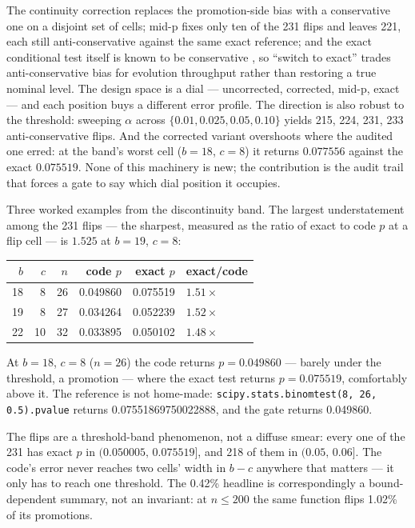 \documentclass[10pt]{article}
\newcommand{\code}[1]{\texttt{#1}}
\begin{document}
\noindent The continuity correction replaces the promotion-side bias with a
conservative one on a disjoint set of cells; mid-p fixes only ten
of the 231 flips and leaves 221, each still anti-conservative against the same
exact reference; and the exact conditional test itself is known to be conservative \citep{fagerland2013mcnemar}, so ``switch to exact'' trades
anti-conservative bias for evolution throughput rather than restoring a true
nominal level. The design space is a dial --- uncorrected, corrected, mid-p,
exact --- and each position buys a different error profile. The direction is
also robust to the threshold: sweeping $\alpha$ across
$\{0.01, 0.025, 0.05, 0.10\}$ yields 215, 224, 231, 233 anti-conservative
flips. And the corrected variant overshoots where the audited one erred: at
the band's worst cell ($b{=}18$, $c{=}8$) it returns $0.077556$ against the
exact $0.075519$. None of this
machinery is new; the contribution is the audit trail that forces a gate to
say which dial position it occupies.

Three worked examples from the discontinuity band. The largest
understatement among the 231 flips --- the sharpest, measured as the ratio
of exact to code $p$ at a flip cell --- is $1.525$ at $b{=}19$, $c{=}8$:

\begin{center}
\begin{tabular}{rrrrrl}
\toprule
$b$ & $c$ & $n$ & code $p$ & exact $p$ & exact/code \\
\midrule
18 & 8 & 26 & 0.049860 & 0.075519 & $1.51\times$ \\
19 & 8 & 27 & 0.034264 & 0.052239 & $1.52\times$ \\
22 & 10 & 32 & 0.033895 & 0.050102 & $1.48\times$ \\
\bottomrule
\end{tabular}
\end{center}

\noindent At $b{=}18$, $c{=}8$ ($n{=}26$) the code returns $p=0.049860$ ---
barely under the threshold, a promotion --- where the exact test returns
$p=0.075519$, comfortably above it. The reference is not home-made:
\code{scipy.stats.binomtest(8, 26, 0.5).pvalue} returns
0.07551869750022888, and the gate returns 0.049860.

The flips are a threshold-band phenomenon, not a diffuse smear: every one of
the 231 has exact $p$ in $(0.050005,\,0.075519]$, and 218 of them in
$(0.05,\,0.06]$. The code's error never reaches two cells' width in $b-c$
anywhere that matters --- it only has to reach one threshold. The 0.42\%
headline is correspondingly a bound-dependent summary, not an invariant: at
$n\le200$ the same function flips 1.02\% of its promotions.
\end{document}
